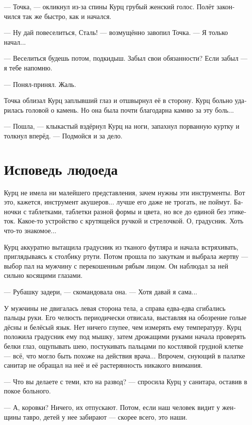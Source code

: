 \documentclass[a4paper,12pt,fleqn]{book}\usepackage{cooltooltips}\usepackage{polyglossia}\setdefaultlanguage[babelshorthands=true]{russian}\setotherlanguage{english}\defaultfontfeatures{Ligatures=TeX,Mapping=tex-text} \usepackage{xcolor}\definecolor{lightgray}{HTML}{bbbbbb}\color{lightgray}\newcommand{\ml}[3]{\textenglish{\textcolor{black}{#3}}}
\begin{document}
--- Точка, --- окликнул из-за спины Курц грубый женский голос.
Полёт закончился так же быстро, как и начался.

--- Ну дай повеселиться, Сталь! --- возмущённо завопил Точка.
--- Я только начал...

--- Веселиться будешь потом, подкидыш.
Забыл свои обязанности?
Если забыл --- я тебе напомню.

--- Понял-принял.
Жаль.

Точка облизал Курц заплывший глаз и отшвырнул её в сторону.
Курц больно ударилась головой о камень.
Но она была почти благодарна камню за эту боль...

--- Пошла, --- клыкастый вздёрнул Курц на ноги, запахнул порванную куртку и толкнул вперёд.
--- Подмойся и за дело.

\section{Исповедь людоеда}

Курц не имела ни малейшего представления, зачем нужны эти инструменты.
Вот это, кажется, инструмент акушеров... лучше его даже не трогать, не поймут.
Баночки с таблетками, таблетки разной формы и цвета, но все до единой без этикеток.
Какое-то устройство с крутящейся ручкой и стрелочкой.
О, градусник.
Хоть что-то знакомое...

Курц аккуратно вытащила градусник из тканого футляра и начала встряхивать, приглядываясь к столбику ртути.
Потом прошла по закуткам и выбрала жертву --- выбор пал на мужчину с перекошенным рябым лицом.
Он наблюдал за ней сильно косящими глазами.

--- Рубашку задери, --- скомандовала она.
--- Хотя давай я сама...

У мужчины не двигалась левая сторона тела, а справа едва-едва сгибались пальцы руки.
Его челюсть периодически отвисала, выставляя на обозрение голые дёсны и белёсый язык.
Нет ничего глупее, чем измерять ему температуру.
Курц положила градусник ему под мышку, затем дрожащими руками начала проверять белки глаз, ощупывать шею, постукивать пальцами по костлявой грудной клетке --- всё, что могло быть похоже на действия врача...
Впрочем, снующий в палатке санитар не обращал на неё и её растерянность никакого внимания.

--- Что вы делаете с теми, кто на развод? --- спросила Курц у санитара, оставив в покое больного.

--- А, коровки?
Ничего, их отпускают.
Потом, если наш человек видит у женщины тавро, детей у нее забирают --- скорее всего, это наши.
\end{document}
